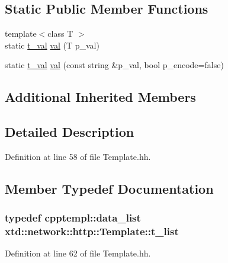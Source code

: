 \subsection*{Static Public Member Functions}
\begin{DoxyCompactItemize}
\item 
{\footnotesize template$<$class T $>$ }\\static \hyperlink{classxtd_1_1network_1_1http_1_1Template_a3834dff3cec2cc0fbc66efed74f29459}{t\+\_\+val} \hyperlink{classxtd_1_1network_1_1http_1_1Template_aab2224df74586a476877a36db8ea2473}{val} (T p\+\_\+val)
\item 
static \hyperlink{classxtd_1_1network_1_1http_1_1Template_a3834dff3cec2cc0fbc66efed74f29459}{t\+\_\+val} \hyperlink{classxtd_1_1network_1_1http_1_1Template_a3a96743542ae1a063e90ec3ec2e774f8}{val} (const string \&p\+\_\+val, bool p\+\_\+encode=false)
\end{DoxyCompactItemize}
\subsection*{Additional Inherited Members}


\subsection{Detailed Description}


Definition at line 58 of file Template.\+hh.



\subsection{Member Typedef Documentation}
\subsubsection[{\texorpdfstring{t\+\_\+list}{t_list}}]{\setlength{\rightskip}{0pt plus 5cm}typedef {\bf cpptempl\+::data\+\_\+list} {\bf xtd\+::network\+::http\+::\+Template\+::t\+\_\+list}}\hypertarget{classxtd_1_1network_1_1http_1_1Template_a8ff314b3439353e666efc48a8443ea17}{}\label{classxtd_1_1network_1_1http_1_1Template_a8ff314b3439353e666efc48a8443ea17}


Definition at line 62 of file Template.\+hh.

